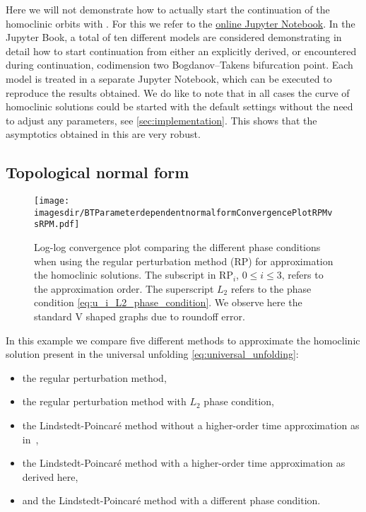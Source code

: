 Here we will not demonstrate how to actually start the continuation of the
homoclinic orbits with \MATCONT. For this we refer to the 
\href{https://mmbosschaert.github.io/MatCont7p2NewInitBTHom-/}{online Jupyter Notebook}.
In the Jupyter Book, a total of ten different models are considered
demonstrating in detail how to start continuation from either an explicitly
derived, or encountered during continuation, codimension two Bogdanov--Takens
bifurcation point. Each model is treated in a separate Jupyter Notebook, which
can be executed to reproduce the results obtained. We do like to note that in
all cases the curve of homoclinic solutions could be started with the default
settings without the need to adjust any parameters, see
\cref{sec:implementation}. This shows that the asymptotics obtained in this
\paper{} are very robust.

\subsection{Topological normal form}
\label{sec:topological_normal_form}

\begin{figure}
    \texttt{[image: \\imagesdir/BTParameterdependentnormalformConvergencePlotRPMvsRPM.pdf]}
    \caption{Log-log convergence plot comparing the different phase conditions
        when using the regular perturbation method (RP) for approximation the
        homoclinic solutions. The subscript in RP$_i$, $0\leq i \leq 3$, refers
        to the approximation order. The superscript $L_2$ refers to the phase
        condition \cref{eq:u_i_L2_phase_condition}. We observe here the standard V
        shaped graphs due to roundoff error.} 
    \label{fig:RP_vs_RPL2}
\end{figure}

In this example we compare five different methods to approximate the homoclinic
solution present in the universal unfolding \cref{eq:universal_unfolding}: 
\begin{itemize}
    \item the regular perturbation method, 
    \item the regular perturbation method with $L_2$ phase condition,
    \item the Lindstedt-Poincar\'e method without a higher-order time
        approximation as in~\cite{Al-Hdaibat2016},
    \item the Lindstedt-Poincar\'e method with a higher-order time
        approximation as derived here, 
    \item and the Lindstedt-Poincar\'e method with a different phase condition.
\end{itemize} 


